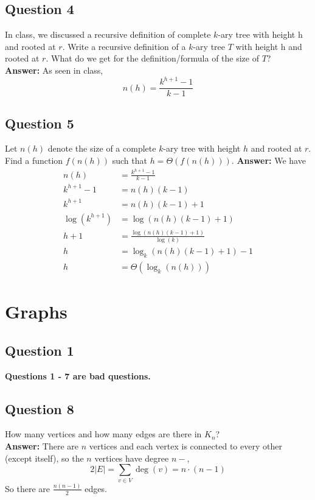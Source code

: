 \documentclass[openany]{report}
\begin{document}
\section{Question 4}
In class, we discussed a recursive definition of complete $k$-ary tree with height h and
rooted at $r$. Write a recursive definition of a $k$-ary tree $T$ with height h and rooted at
$r$. What do we get for the definition/formula of the size of $T$?\\[2ex]
\textbf{Answer:} As seen in class, 
\[n(h) = \frac{k^{h+1} - 1}{k-1}\]
\section{Question 5}
Let $n(h)$ denote the size of a complete $k$-ary tree with height $h$ and rooted at $r$. Find
a function $f(n(h))$ such that $h = \Theta(f(n(h)))$.
\textbf{Answer:} We have 
\begin{align*}
    n(h) &= \frac{k^{h+1} - 1}{k-1}\\
    k^{h+1} -1 &= n(h)(k-1)\\
    k^{h+1} &= n(h)(k-1) + 1\\
    \log(k^{h+1}) &= \log(n(h)(k-1) + 1)\\
    h+1 &= \frac{\log(n(h)(k-1) +1)}{\log(k)}\\
    h &= \log_k(n(h)(k-1) + 1) - 1\\
    h &= \Theta(\log_k(n(h)))
\end{align*}
\chapter{Graphs}
\section{Question 1}
\begin{center}
    \textbf{Questions 1 - 7 are bad questions.}
\end{center}
\setcounter{section}{7}
\section{Question 8}
How many vertices and how many edges are there in $K_n$? \\[2ex]
\textbf{Answer:} There are $n$ vertices and each vertex is connected to every other (except itself), so the $n$ vertices have degree $n-$, 
\[2|E| = \sum_{v \in V} \deg(v) = n \cdot (n - 1)\]
So there are $\frac{n(n-1)}{2}$ edges.
\end{document}
